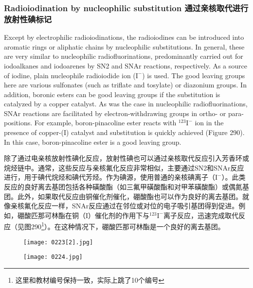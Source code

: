 \documentclass[dvipsnames, svgnames,a4paper,11pt]{article}
\begin{document}
\subsubsection{Radioiodination by nucleophilic substitution 通过亲核取代进行放射性碘标记}  
Except by electrophilic radioiodinations, the radioiodines can be introduced into aromatic rings or aliphatic chains by nucleophilic substitutions. In general, these are very similar to nucleophilic radiofluorinations, predominantly carried out for iodoalkanes and iodoarenes by SN2 and SNAr reactions, respectively. As a source of iodine, plain nucleophile radioiodide ion (\(\mathrm{I^-}\)) is used. The good leaving groups here are various sulfonates (such as triflate and tosylate) or diazonium groups. In addition, boronic esters can be good leaving groups if the substitution is catalyzed by a copper catalyst. As was the case in nucleophilic radiofluorinations, SNAr reactions are facilitated by electron-withdrawing groups in ortho- or para- positions. For example, boron-pinacoline ester reacts with \(\mathrm{^{123}I^-}\) ion in the presence of copper-(I) catalyst and substitution is quickly achieved (Figure 290). In this case, boron-pinacoline ester is a good leaving group.  

除了通过电亲核放射性碘化反应，放射性碘也可以通过亲核取代反应引入芳香环或烷烃链中。通常，这些反应与亲核氟化反应非常相似，主要通过SN2和SNAr反应进行，用于碘代烷烃和碘代芳烃。作为碘源，使用普通的亲核碘离子（\(\mathrm{I^-}\)）。此类反应的良好离去基团包括各种磺酸酯（如三氟甲磺酸酯和对甲苯磺酸酯）或偶氮基团。此外，如果取代反应由铜催化剂催化，硼酸酯也可以作为良好的离去基团。就像亲核氟化反应一样，SNAr反应通过在邻位或对位的电子吸引基团得到促进。例如，硼酸匹那可林酯在铜（I）催化剂的作用下与\(\mathrm{^{123}I^-}\)离子反应，迅速完成取代反应（见图290\footnote{这里和教材编号保持一致，实际上跳了10个编号}）。在这种情况下，硼酸匹那可林酯是一个良好的离去基团。  

\begin{figure}[h]
	\centering
    \texttt{[image: 0223[2].jpg]}  
     \label{fig290}
\end{figure}

\begin{figure}[h]
	\centering
    \texttt{[image: 0224.jpg]}  
     \label{fig291}
\end{figure}
\end{document}
